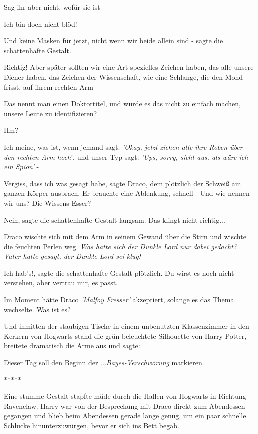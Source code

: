 \glqq{}Sag ihr aber nicht, wofür sie ist -\grqq{}

\glqq{}Ich bin doch nicht blöd!\grqq{}

\glqq{}Und keine Masken für jetzt, nicht wenn wir beide allein sind -\grqq{}
sagte die schattenhafte Gestalt.

\glqq{}Richtig! Aber später sollten wir eine Art spezielles Zeichen haben, das
alle unsere Diener haben, das Zeichen der Wissenschaft, wie eine Schlange, die
den Mond frisst, auf ihrem rechten Arm -\grqq{}

\glqq{}Das nennt man einen Doktortitel, und würde es das nicht zu einfach machen,
unsere Leute zu identifizieren?\grqq{}

\glqq{}Hm?\grqq{}

\glqq{}Ich meine, was ist, wenn jemand sagt: \emph{'Okay, jetzt ziehen alle ihre
Roben über den rechten Arm hoch}', und unser Typ sagt: \emph{'Ups, sorry, sieht
aus, als wäre ich ein Spion'} -\grqq{}

\glqq{}Vergiss, dass ich was gesagt habe\grqq{}, sagte Draco, dem plötzlich der
Schweiß am ganzen Körper ausbrach. Er brauchte eine Ablenkung, schnell - \glqq
Und wie nennen wir uns? Die Wissens-Esser?\grqq{}

\glqq{}Nein\grqq{}, sagte die schattenhafte Gestalt langsam. \glqq{}Das klingt
nicht richtig...\grqq{}

Draco wischte sich mit dem Arm in seinem Gewand über die Stirn und wischte die
feuchten Perlen weg. \emph{Was hatte sich der Dunkle Lord nur dabei gedacht?
Vater hatte gesagt, der Dunkle Lord sei klug!}

\glqq{}Ich hab's!\grqq{}, sagte die schattenhafte Gestalt plötzlich. \glqq{}Du
wirst es noch nicht verstehen, aber vertrau mir, es passt.\grqq{}

Im Moment hätte Draco \emph{'Malfoy Fresser'} akzeptiert, solange es das Thema
wechselte. \glqq{}Was ist es?\grqq{}

Und inmitten der staubigen Tische in einem unbenutzten Klassenzimmer in den
Kerkern von Hogwarts stand die grün beleuchtete Silhouette von Harry Potter,
breitete dramatisch die Arme aus und sagte:

\glqq{}Dieser Tag soll den Beginn der ...\emph{Bayes-Verschwörung}
markieren.\grqq{}

\begin{center}*****\end{center}

Eine stumme Gestalt stapfte müde durch die Hallen von Hogwarts in Richtung
Ravenclaw. Harry war von der Besprechung mit Draco direkt zum Abendessen
gegangen und blieb beim Abendessen gerade lange genug, um ein paar schnelle
Schlucke hinunterzuwürgen, bevor er sich ins Bett begab.

